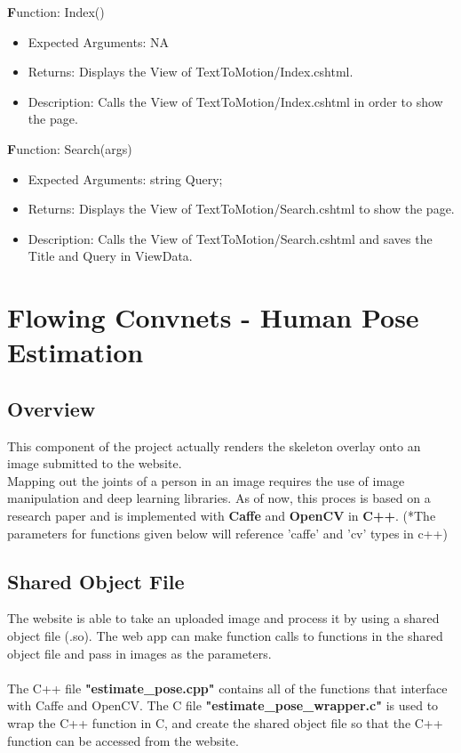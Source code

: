 \documentclass{scrreprt}
\begin{document}
  \textbf Function: Index()
  \begin{itemize}
    \item Expected Arguments:
    NA
    \item Returns:
    Displays the View of TextToMotion/Index.cshtml.
    \item Description:
    Calls the View of TextToMotion/Index.cshtml in order to show the page.
  \end{itemize}

  \textbf Function: Search(args)
  \begin{itemize}
    \item Expected Arguments:
    string Query;
    \item Returns:
    Displays the View of TextToMotion/Search.cshtml to show the page.
    \item Description:
    Calls the View of TextToMotion/Search.cshtml and saves the Title and Query in ViewData.
  \end{itemize}

\break


\section{Flowing Convnets - Human Pose Estimation}

\subsection{Overview}

This component of the project actually renders the skeleton overlay onto an image submitted to the website.
\\
Mapping out the joints of a person in an image requires the use of image manipulation and deep learning libraries. As of now, this proces is based on a research paper and is implemented with \textbf{Caffe} and \textbf{OpenCV} in \textbf{C++}. (*The parameters for functions given below will reference 'caffe' and 'cv' types in c++)



\subsection{Shared Object File}

The website is able to take an uploaded image and process it by using a shared object file (.so). The web app can make function calls to functions in the shared object file and pass in images as the parameters.
\\\\
The C++ file \textbf{"estimate\_pose.cpp"} contains all of the functions that interface with Caffe and OpenCV. The C file \textbf{"estimate\_pose\_wrapper.c"} is used to wrap the C++ function in C, and create the shared object file so that the C++ function can be accessed from the website.
\end{document}
